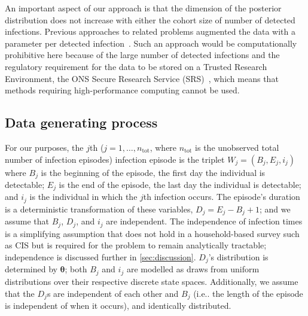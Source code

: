 \documentclass[12pt]{article}
\makeatletter
\renewcommand{\vec}[1]{\bm{#1}}
\newcommand{\ntot}{n_\text{tot}}
\DeclareRobustCommand\onedot{\futurelet\@let@token\@onedot}
\def\@onedot{\ifx\@let@token.\else.\null\fi\xspace}
\def\ie{i.e\onedot} \def\Ie{{I.e}\onedot}
\makeatother
\begin{document}
An important aspect of our approach is that the dimension of the posterior distribution does not increase with either the cohort size of number of detected infections.
Previous approaches to related problems augmented the data with a parameter per detected infection~\citep{heBayesiana,heBayesian,caoModeling}.
Such an approach would be computationally prohibitive here because of the large number of detected infections and the regulatory requirement for the data to be stored on a Trusted Research Environment, the ONS Secure Research Service (SRS)~\citep{onsSRS}, which means that methods requiring high-performance computing cannot be used.

\subsection{Data generating process}

For our purposes, the $j$th ($j = 1, \dots, \ntot$, where $\ntot$ is the unobserved total number of infection episodes) infection episode is the triplet $W_j = (B_j, E_j, i_j)$ where $B_j$ is the beginning of the episode, the first day the individual is detectable; $E_j$ is the end of the episode, the last day the individual is detectable; and $i_j$ is the individual in which the $j$th infection occurs.
The episode's duration is a deterministic transformation of these variables, $D_j = E_j - B_j + 1$; and we assume that $B_j$, $D_j$, and $i_j$ are independent.
The independence of infection times is a simplifying assumption that does not hold in a household-based survey such as CIS but is required for the problem to remain analytically tractable; independence is discussed further in \cref{sec:discussion}.
$D_j$'s distribution is determined by $\vec{\theta}$; both $B_j$ and $i_j$ are modelled as draws from uniform distributions over their respective discrete state spaces.
Additionally, we assume that the $D_j$s are independent of each other and $B_j$ (\ie the length of the episode is independent of when it occurs), and identically distributed.

\end{document}
